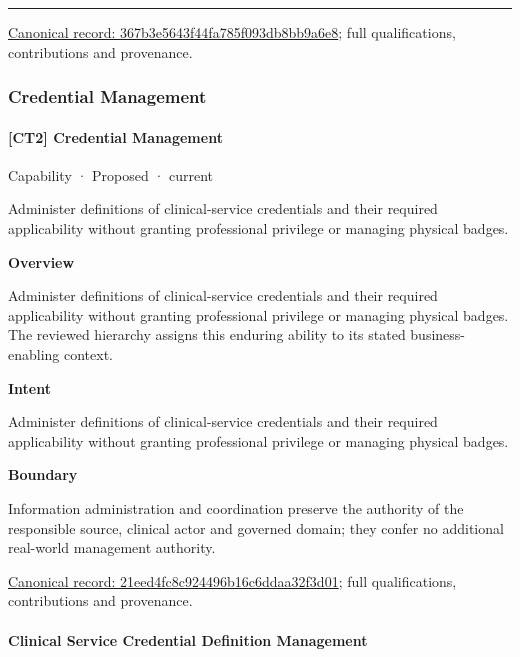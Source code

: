 \medskip\hrule\medskip

{\footnotesize \href{../../../../continuum/strategy/capability/367b3e5643f44fa785f093db8bb9a6e8.md}{Canonical record: 367b3e5643f44fa785f093db8bb9a6e8}; full qualifications, contributions and provenance.}\par
\subsubsection{Credential Management}

\paragraph{[CT2] Credential Management}

\label{element:21eed4fc8c924496b16c6ddaa32f3d01}
{\small Capability · Proposed · current}\par

Administer definitions of clinical-service credentials and their required applicability without granting professional privilege or managing physical badges.



\textbf{Overview}



Administer definitions of clinical-service credentials and their required applicability without granting professional privilege or managing physical badges. The reviewed hierarchy assigns this enduring ability to its stated business-enabling context.



\textbf{Intent}



Administer definitions of clinical-service credentials and their required applicability without granting professional privilege or managing physical badges.



\textbf{Boundary}



Information administration and coordination preserve the authority of the responsible source, clinical actor and governed domain; they confer no additional real-world management authority.


{\footnotesize \href{../../../../continuum/strategy/capability/21eed4fc8c924496b16c6ddaa32f3d01.md}{Canonical record: 21eed4fc8c924496b16c6ddaa32f3d01}; full qualifications, contributions and provenance.}\par
\paragraph{Clinical Service Credential Definition Management}

